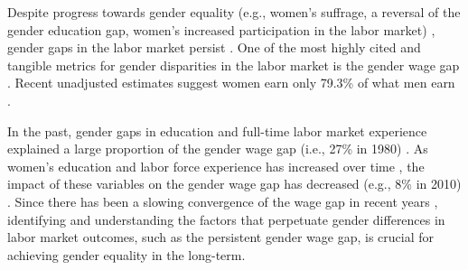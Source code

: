 \documentclass[a4paper, nobind]{templates/ociamthesis}
\begin{document}
Despite progress towards gender equality (e.g., women's suffrage, a reversal of the gender education gap, women's increased participation in the labor market) \autocite{Goldin2014,Goldin2006a,Goldin2006,Blau2010,Blau2013,Blau2014,Bianchi2012,Sayer2005}, gender gaps in the labor market persist \autocite{Blau2017,Goldin2014,Hegewisch2014,Bertrand2001,Blau2014,Levanon2016,Blau2006b,Blau2006a}. One of the most highly cited and tangible metrics for gender disparities in the labor market is the gender wage gap \autocite{Blau2000,Blau2017,Nyhus2012,McGee2015,Goldin2014,Hegewisch2014,Bertrand2001,Blau2006b}. Recent unadjusted estimates suggest women earn only 79.3\% of what men earn \autocite{Blau2017}.

In the past, gender gaps in education and full-time labor market experience explained a large proportion of the gender wage gap (i.e., 27\% in 1980) \autocite{Blau2017}. As women's education and labor force experience has increased over time \autocite{Goldin2006a}, the impact of these variables on the gender wage gap has decreased (e.g., 8\% in 2010) \autocite{Blau2017}. Since there has been a slowing convergence of the wage gap in recent years \autocite{Blau2006b}, identifying and understanding the factors that perpetuate gender differences in labor market outcomes, such as the persistent gender wage gap, is crucial for achieving gender equality in the long-term.
\end{document}
